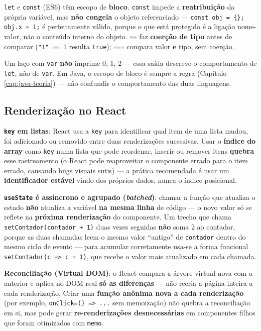 \begin{conceito}
\texttt{let} e \texttt{const} (ES6) têm escopo de \textbf{bloco}.
\texttt{const} impede a \textbf{reatribuição} da própria variável, mas
\textbf{não congela} o objeto referenciado --- \texttt{const obj = \{\};
obj.x = 1;} é perfeitamente válido, porque o que está protegido é a
ligação nome-valor, não o conteúdo interno do objeto.
\texttt{==} faz \textbf{coerção de tipo} antes de comparar
(\texttt{"1" == 1} resulta \texttt{true}); \texttt{===} compara valor
\textbf{e} tipo, sem coerção.
\end{conceito}

\begin{cuidado}
Um laço com \texttt{var} \textbf{não} imprime 0, 1, 2 --- essa saída
descreve o comportamento de \texttt{let}, não de \texttt{var}. Em Java, o
escopo de bloco é sempre a regra (Capítulo \ref{cap:java-teoria}) --- não
confundir o comportamento das duas linguagens.
\end{cuidado}

\subsection{Renderização no React}

\begin{conceito}
\textbf{\texttt{key} em listas}: React usa a \texttt{key} para
identificar qual item de uma lista mudou, foi adicionado ou removido
entre duas renderizações sucessivas. Usar o \textbf{índice do array}
como \texttt{key} numa lista que pode reordenar, inserir ou remover
itens \textbf{quebra} esse rastreamento (o React pode reaproveitar o
componente errado para o item errado, causando bugs visuais sutis) --- a
prática recomendada é usar um \textbf{identificador estável} vindo dos
próprios dados, nunca o índice posicional.

\textbf{\texttt{useState} é assíncrono e agrupado (\textit{batched})}:
chamar a função que atualiza o estado \textbf{não} atualiza a variável
\textbf{na mesma linha} de código --- o novo valor só se reflete na
\textbf{próxima renderização} do componente. Um trecho que chama
\texttt{setContador(contador + 1)} duas vezes seguidas \textbf{não} soma
2 ao contador, porque as duas chamadas leem o mesmo valor “antigo” de
\texttt{contador} dentro do mesmo ciclo de evento --- para acumular
corretamente usa-se a forma funcional \texttt{setContador(c => c + 1)},
que recebe o valor mais atualizado em cada chamada.

\textbf{Reconciliação (Virtual DOM)}: o React compara a árvore virtual
nova com a anterior e aplica no DOM real \textbf{só as diferenças} ---
não recria a página inteira a cada renderização. Criar uma
\textbf{função anônima nova a cada renderização} (por exemplo,
\texttt{onClick={() => ...}} sem memoização) não quebra a reconciliação
em si, mas pode gerar \textbf{re-renderizações desnecessárias} em
componentes filhos que foram otimizados com \texttt{memo}.
\end{conceito}

